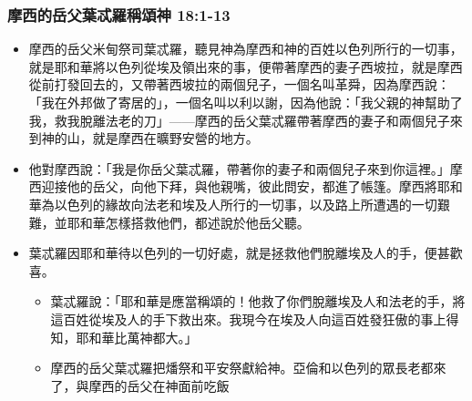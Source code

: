\subsubsection{摩西的岳父葉忒羅稱頌神 18:1-13 }
\begin{itemize} 
\itemsep-.35em
\item 摩西的岳父米甸祭司葉忒羅，聽見神為摩西和神的百姓以色列所行的一切事，就是耶和華將以色列從埃及領出來的事，便帶著摩西的妻子西坡拉，就是摩西從前打發回去的，又帶著西坡拉的兩個兒子，一個名叫革舜，因為摩西說：「我在外邦做了寄居的」，一個名叫以利以謝，因為他說：「我父親的神幫助了我，救我脫離法老的刀」——摩西的岳父葉忒羅帶著摩西的妻子和兩個兒子來到神的山，就是摩西在曠野安營的地方。
\item 他對摩西說：「我是你岳父葉忒羅，帶著你的妻子和兩個兒子來到你這裡。」摩西迎接他的岳父，向他下拜，與他親嘴，彼此問安，都進了帳篷。摩西將耶和華為以色列的緣故向法老和埃及人所行的一切事，以及路上所遭遇的一切艱難，並耶和華怎樣搭救他們，都述說於他岳父聽。
\item 葉忒羅因耶和華待以色列的一切好處，就是拯救他們脫離埃及人的手，便甚歡喜。
\begin{itemize} 
\itemsep-.35em
\item 葉忒羅說：「耶和華是應當稱頌的！他救了你們脫離埃及人和法老的手，將這百姓從埃及人的手下救出來。我現今在埃及人向這百姓發狂傲的事上得知，耶和華比萬神都大。」
\item 摩西的岳父葉忒羅把燔祭和平安祭獻給神。亞倫和以色列的眾長老都來了，與摩西的岳父在神面前吃飯
\end{itemize}
\end{itemize}

